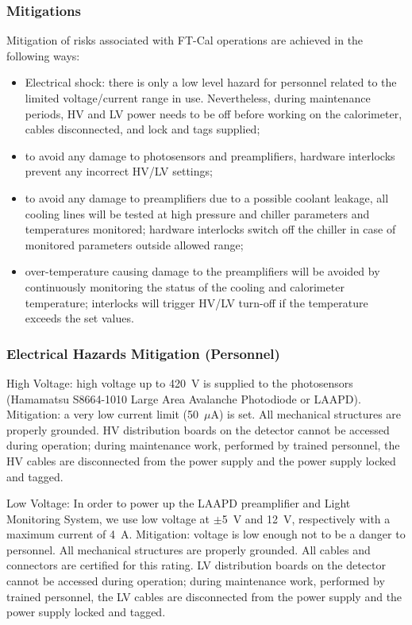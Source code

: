 \subsubsection{Mitigations}

Mitigation of risks associated with FT-Cal operations are achieved in the following ways:

\begin{itemize}
\item {Electrical shock: there is only a low level hazard for personnel related to the limited 
voltage/current range in use. Nevertheless, during maintenance periods,  HV and LV  power needs 
to be off before working on the calorimeter, cables disconnected, and lock and tags supplied;}
\item  {to avoid any damage to photosensors and preamplifiers, hardware  interlocks prevent 
any incorrect HV/LV settings; }
\item  {to avoid any damage to preamplifiers due to a possible coolant leakage, all cooling 
lines will be tested at high pressure and chiller parameters and temperatures monitored; 
hardware interlocks switch off the chiller in case of monitored parameters outside 
allowed range; }
\item {over-temperature causing damage to the preamplifiers will be avoided by continuously 
monitoring the status of the cooling and calorimeter temperature; interlocks will trigger HV/LV 
turn-off if the temperature exceeds the set values.}
\end{itemize}

\subsubsection{Electrical Hazards Mitigation (Personnel)}

High Voltage: high voltage up to 420~V is supplied to the photosensors (Hamamatsu S8664-1010 
Large Area Avalanche Photodiode or LAAPD). Mitigation: a very low current limit (50~$\mu$A) is 
set. All mechanical structures are properly grounded. HV distribution boards on the detector 
cannot be accessed during operation; during maintenance work, performed by trained personnel, 
the HV cables are disconnected from the power supply and the power supply locked and tagged.

Low Voltage: In order to power up the LAAPD preamplifier and Light Monitoring System, we use 
low voltage at $\pm$5~V and 12~V, respectively with a maximum current of 4~A. Mitigation: 
voltage is low enough not to be a danger to personnel. All mechanical structures are properly 
grounded. All cables and connectors are certified for this rating. LV distribution boards on 
the detector cannot be accessed during operation; during maintenance work, performed by trained 
personnel, the LV cables are disconnected from the power supply and the power supply locked and 
tagged.

